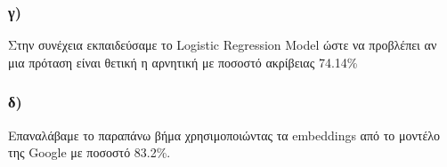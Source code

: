 \documentclass[a4paper, 12pt]{article}
\begin{document}
        \subsubsection*{γ)}
        	Στην συνέχεια εκπαιδεύσαμε το Logistic Regression Model ώστε να προβλέπει αν μια πρόταση είναι θετική η αρνητική με ποσοστό ακρίβειας 74.14\%
        \subsubsection*{δ)}
        	Επαναλάβαμε το παραπάνω βήμα χρησιμοποιώντας τα embeddings από το μοντέλο της Google με ποσοστό 83.2\%.
\end{document}
